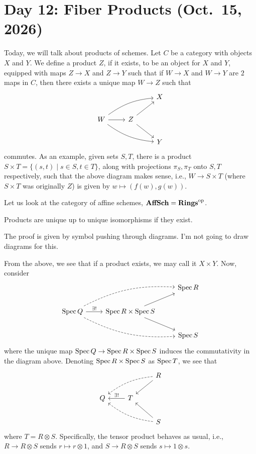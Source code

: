 \section{Day 12: Fiber Products (Oct.\ 15, 2026)}
Today, we will talk about products of schemes. Let $C$ be a category with objects $X$ and $Y$. We define a product $Z$, if it exists, to be an object for $X$ and $Y$, equipped with maps $Z \to X$ and $Z \to Y$ such that if $W \to X$ and $W \to Y$ are $2$ maps in $C$, then there exists a unique map $W \to Z$ such that
\[ \begin{tikzcd} & & X \\ W \arrow[r] \arrow[rru, bend left = 15] \arrow[rrd, bend right = 15] & Z \arrow[ru] \arrow[rd] \\ & & Y \end{tikzcd} \]
commutes. As an example, given sets $S, T$, there is a product $S \times T = \{(s, t) \mid s \in S, t \in T\}$, along with projections $\pi_S, \pi_T$ onto $S, T$ respectively, such that the above diagram makes sense, i.e., $W \to S \times T$ (where $S \times T$ was originally $Z$) is given by $w \mapsto (f(w), g(w))$.

Let us look at the category of affine schemes, $\mathbf{AffSch} = \mathbf{Rings}^\text{op}$.
\begin{theorem} \label{thm:product_category_unique}
    Products are unique up to unique isomorphisms if they exist.
\end{theorem}
{\color{crimson} The proof is given by symbol pushing through diagrams. I'm not going to draw diagrams for this.}

From the above, we see that if a product exists, we may call it $X \times Y$. Now, consider
\[ \begin{tikzcd}
    & & \Spec R \\
    \Spec Q \arrow[r, "\exists!"] \arrow[rru, dashed, bend left = 15] \arrow[rrd, dashed, bend right = 15] & \Spec R \times \Spec S \arrow[ru] \arrow[rd] \\
    & & \Spec S
\end{tikzcd} \]
where the unique map $\operatorname{Spec} Q \to \operatorname{Spec} R \times \operatorname{Spec} S$ induces the commutativity in the diagram above. Denoting $\operatorname{Spec} R \times \operatorname{Spec} S$ as $\operatorname{Spec} T$, we see that
\[ \begin{tikzcd}
    & & R \arrow[dl] \arrow[lld, dashed, bend right = 15] \\
    Q & T \arrow[l, "\exists!"'] \\
    & & S \arrow[ul] \arrow[llu, dashed, bend left = 15]
\end{tikzcd} \]
where $T = R \otimes S$. Specifically, the tensor product behaves as usual, i.e., $R \to R \otimes S$ sends $r \mapsto r \otimes 1$, and $S \to R \otimes S$ sends $s \mapsto 1 \otimes s$.


